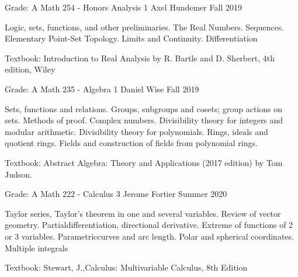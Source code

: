 \begin{cventries}
    \cventry
    {Grade: A} %
    {Math 254 - Honors Analysis 1} %
    {Axel Hundemer} %
    {Fall 2019} %
    {
      \begin{cvitems} %
      \item {Logic, sets, functions, and other preliminaries. The Real Numbers. Sequences. Elementary Point-Set Topology. Limits and Continuity. Differentiation}
      \item {Textbook: Introduction to Real Analysis by R. Bartle and D. Sherbert, 4th edition, Wiley}
      \end{cvitems}
    }


    \cventry
    {Grade: A} %
    {Math 235 - Algebra 1} %
    {Daniel Wise } %
    {Fall 2019} %
    {
      \begin{cvitems} %
      \item {Sets, functions and relations. Groups, subgroups and cosets; group actions on sets. Methods of proof. Complex numbers. Divisibility theory for integers and modular arithmetic. Divisibility theory for polynomials. Rings, ideals and quotient rings. Fields and construction of fields from polynomial rings. }
      \item {Textbook: Abstract Algebra: Theory and Applications (2017 edition) by Tom Judson.}
      \end{cvitems}
    }


    \cventry
    {Grade: A} %
    {Math 222 - Calculus 3} %
    {Jerome Fortier} %
    {Summer 2020} %
    {
      \begin{cvitems} %
      \item {Taylor series, Taylor’s theorem in one and several variables. Review of vector geometry. Partialdifferentiation, directional derivative.  Extreme of functions of 2 or 3 variables.  Parametriccurves and arc length. Polar and spherical coordinates. Multiple integrals}
      \item {Textbook: Stewart, J.,Calculus: Multivariable Calculus, 8th Edition}
      \end{cvitems}
    }



\end{cventries}
